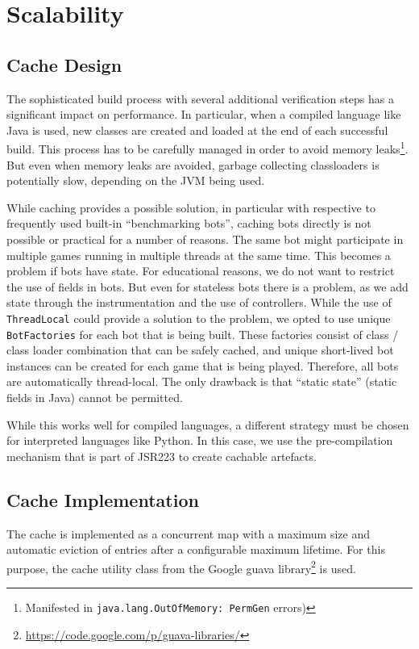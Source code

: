 \section{Scalability}

\subsection{Cache Design}

The sophisticated build process with several additional verification steps has a significant impact on performance. In particular, when a compiled language like Java is used, new classes are created and loaded at the end of each successful build. This process has to be carefully managed in order to avoid memory leaks\footnote{Manifested in \texttt{java.lang.OutOfMemory: PermGen} errors)}. But even when memory leaks are avoided, garbage collecting classloaders is potentially slow, depending on the JVM being used.

While caching provides a possible solution, in particular with respective to frequently used built-in ``benchmarking bots'', caching bots directly is not possible or practical for a number of reasons. The same bot might participate in multiple games running in multiple threads at the same time. This becomes a problem if bots have state. For educational reasons, we do not want to restrict the use of fields in bots. But even for stateless bots there is a problem, as we add state through the instrumentation and the use of controllers. While the use of \texttt{ThreadLocal} could provide a solution to the problem, we opted to use unique \texttt{BotFactories} for each bot that is being built. These factories consist of class / class loader combination that can be safely cached, and unique short-lived bot instances can be created for each game that is being played. Therefore, all bots are automatically thread-local. The only drawback is that ``static state'' (static fields in Java) cannot be permitted. 

While this works well for compiled languages, a different strategy must be chosen for interpreted languages like Python. In this case, we use the pre-compilation mechanism that is part of JSR223 \cite{grogan2006jsr} to create cachable artefacts. 

\subsection{Cache Implementation}

The cache is implemented as a concurrent map with a maximum size and automatic eviction of entries after a configurable maximum lifetime. For this purpose, the cache utility class from the Google guava library\footnote{\url{https://code.google.com/p/guava-libraries/}} is used. 

